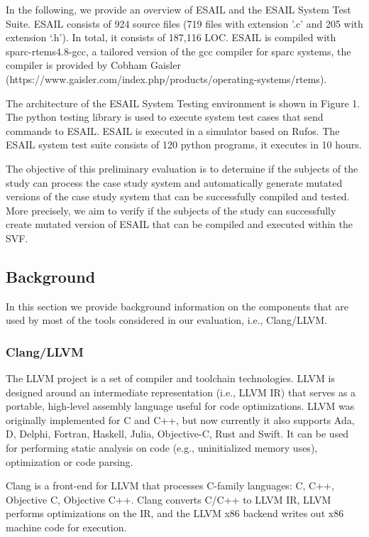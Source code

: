 In the following, we provide an overview of ESAIL and the ESAIL System Test Suite. ESAIL consists of 924 source files (719 files with extension '.c' and 205 with extension ‘.h’). In total, it consists of 187,116 LOC. ESAIL is compiled with sparc-rtems4.8-gcc, a tailored version of the gcc compiler for sparc systems, the compiler is provided by Cobham Gaisler (https://www.gaisler.com/index.php/products/operating-systems/rtems).

The architecture of the ESAIL System Testing environment is shown in Figure 1. The python testing library is used to execute system test cases that send commands to ESAIL. ESAIL is executed in a simulator based on Rufos. The ESAIL system test suite consists of 120 python programs, it executes in 10 hours.

The objective of this preliminary evaluation is to determine if the subjects of the study can process the case study system and automatically generate mutated versions of the case study system that can be successfully compiled and tested. More precisely, we aim to verify if the subjects of the study can successfully create mutated version of ESAIL that can be compiled and executed within the SVF.

\subsection{Background}

In this section we provide background information on the components that are used by most of the tools considered in our evaluation, i.e., Clang/LLVM.

\subsubsection{Clang/LLVM}

The LLVM project is a set of compiler and toolchain technologies. LLVM is designed around an intermediate representation (i.e., LLVM IR) that serves as a portable, high-level assembly language useful for code optimizations. LLVM was originally implemented for C and C++, but now currently it also supports Ada, D, Delphi, Fortran, Haskell, Julia, Objective-C, Rust and Swift. It can be used for performing static analysis on code (e.g., uninitialized memory uses), optimization or code parsing.

Clang is a front-end for LLVM that processes C-family languages: C, C++, Objective C, Objective C++. Clang converts C/C++ to LLVM IR, LLVM performs optimizations on the IR, and the LLVM x86 backend writes out x86 machine code for execution.

